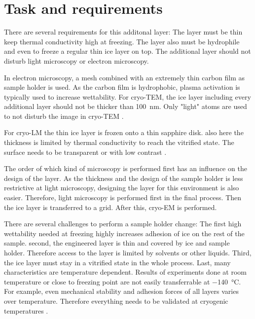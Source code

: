 \section{Task and requirements}

There are several requirements for this additonal layer: The layer must be thin keep thermal conductivity high at freezing. The layer also must be hydrophile and even to freeze a regular thin ice layer on top. The additional layer should not disturb light microscopy or electron microscopy. 


In electron microscopy, a mesh combined with an extremely thin carbon film as sample holder is used. As the carbon film is hydrophobic, plasma activation is typically used to increase wettability. For cryo-TEM, the ice layer including every additional layer should not be thicker than \SI{100}{\nano\meter}. Only "light" atoms are used to not disturb the image in cryo-TEM \cite{Danino.2012}. 

For cryo-LM the thin ice layer is frozen onto a thin sapphire disk. also here the thickness is limited by thermal conductivity to reach the vitrified state. The surface needs to be transparent or with low contrast \cite{Faoro.2018}.

The order of which kind of microscopy is performed first has an influence on the design of the layer. As the thickness and the design of the sample holder is less restrictive at light microscopy, designing the layer for this environment is also easier. Therefore, light microscopy is performed first in the final process. Then the ice layer is transferred to a grid. After this, cryo-EM is performed.

There are several challenges to perform a sample holder change: The first high wettability needed at freezing highly increases adhesion of ice on the rest of the sample. second, the engineered layer is thin and covered by ice and sample holder. Therefore access to the layer is limited by solvents or other liquids. Third, the ice layer must stay in a vitrified state in the whole process. Last, many characteristics are temperature dependent. Results of experiments done at room temperature or close to freezing point are not easily transferrable at \SI{-140}{\degreeCelsius}. For example, even mechanical stability and adhesion forces of all layers varies over temperature. Therefore everything needs to be validated at cryogenic temperatures \cite{Makkonen.2012}.

